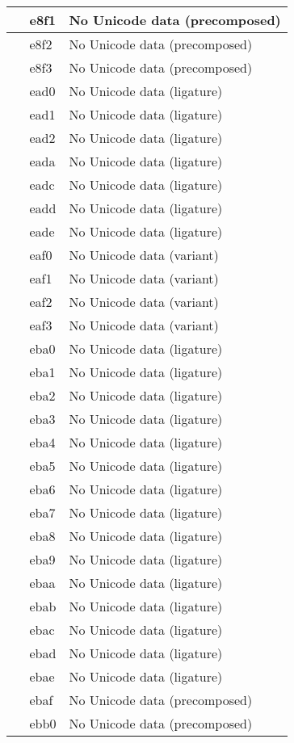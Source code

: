 \documentclass[12pt,letterpaper,openany]{book}
\begin{document}
\begin{center}
\begin{supertabular}{|m{0.25in}|m{0.5in}|m{4in}|}
 & e8f1 & No Unicode data (precomposed)\\\hline
 & e8f2 & No Unicode data (precomposed)\\\hline
 & e8f3 & No Unicode data (precomposed)\\\hline
 & ead0 & No Unicode data (ligature)\\\hline
 & ead1 & No Unicode data (ligature)\\\hline
 & ead2 & No Unicode data (ligature)\\\hline
 & eada & No Unicode data (ligature)\\\hline
 & eadc & No Unicode data (ligature)\\\hline
 & eadd & No Unicode data (ligature)\\\hline
 & eade & No Unicode data (ligature)\\\hline
 & eaf0 & No Unicode data (variant)\\\hline
 & eaf1 & No Unicode data (variant)\\\hline
 & eaf2 & No Unicode data (variant)\\\hline
 & eaf3 & No Unicode data (variant)\\\hline
 & eba0 & No Unicode data (ligature)\\\hline
 & eba1 & No Unicode data (ligature)\\\hline
 & eba2 & No Unicode data (ligature)\\\hline
 & eba3 & No Unicode data (ligature)\\\hline
 & eba4 & No Unicode data (ligature)\\\hline
 & eba5 & No Unicode data (ligature)\\\hline
 & eba6 & No Unicode data (ligature)\\\hline
 & eba7 & No Unicode data (ligature)\\\hline
 & eba8 & No Unicode data (ligature)\\\hline
 & eba9 & No Unicode data (ligature)\\\hline
 & ebaa & No Unicode data (ligature)\\\hline
 & ebab & No Unicode data (ligature)\\\hline
 & ebac & No Unicode data (ligature)\\\hline
 & ebad & No Unicode data (ligature)\\\hline
 & ebae & No Unicode data (ligature)\\\hline
 & ebaf & No Unicode data (precomposed)\\\hline
 & ebb0 & No Unicode data (precomposed)\\\hline

\end{supertabular}
\end{center}
\end{document}
